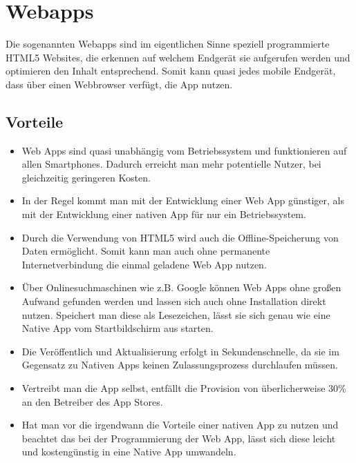 \section{Webapps}
\label{sec:intro:webapp}

Die sogenannten Webapps sind im eigentlichen Sinne speziell programmierte HTML5 Websites, die erkennen auf welchem Endgerät sie aufgerufen werden und optimieren den Inhalt entsprechend. Somit kann quasi jedes mobile Endgerät, dass über einen Webbrowser verfügt, die App nutzen.

\subsection{Vorteile}
\label{sec:webapp:pros}

\begin{itemize}

	\item Web Apps sind quasi unabhängig vom Betriebssystem und funktionieren auf allen Smartphones. Dadurch erreicht man mehr potentielle Nutzer, bei gleichzeitig geringeren Kosten.\cite[]{WEB:APPEV:2014}

	\item In der Regel kommt man mit der Entwicklung einer Web App günstiger, als mit der Entwicklung einer nativen App für nur ein Betriebssystem.\cite[]{WEB:APPEV:2014}

	\item Durch die Verwendung von HTML5 wird auch die Offline-Speicherung von Daten ermöglicht. Somit kann man auch ohne permanente Internetverbindung die einmal geladene Web App nutzen.\cite[]{WEB:APPEV:2014}

	\item Über Onlinesuchmaschinen wie z.B. Google können Web Apps ohne großen Aufwand gefunden werden und lassen sich auch ohne Installation direkt nutzen. Speichert man diese als Lesezeichen, lässt sie sich genau wie eine Native App vom Startbildschirm aus starten.\cite[]{WEB:APPEV:2014}

	\item Die Veröffentlich und Aktualisierung erfolgt in Sekundenschnelle, da sie im Gegensatz zu Nativen Apps keinen Zulassungsprozess durchlaufen müssen.\cite[]{WEB:APPEV:2014}

	\item Vertreibt man die App selbst, entfällt die Provision von überlicherweise 30\% an den Betreiber des App Stores.\cite[]{WEB:APPEV:2014}

	\item Hat man vor die irgendwann die Vorteile einer nativen App zu nutzen und beachtet das bei der Programmierung der Web App, lässt sich diese leicht und kostengünstig in eine Native App umwandeln.\cite[]{WEB:APPEV:2014}

\end{itemize}


